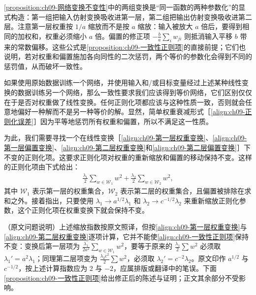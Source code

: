 \documentclass[../../main.tex]{subfiles}
\begin{document}
\begin{remark}\cref{proposition:ch09-网络变换不变性}中的两组变换是“同一函数的两种参数化”的显式构造：第一组把输入仿射变换吸收进第一层，第二组把输出仿射变换吸收进第二层。注意第一层权重按 $1/a$ 缩放而不是按 $a$ 缩放：输入被放大 $a$ 倍后，要得到相同的加权和，权重必须缩小 $a$ 倍。偏置的修正项 $-\frac{b}{a}\sum_{i}w_{ji}$ 则抵消输入平移 $b$ 带来的常数偏移。这些公式是\cref{proposition:ch09-一致性正则项}的直接前提；它们也说明，若对权重和偏置施加各向同性的二次惩罚，两个等价的参数化会得到不同的惩罚值，从而破坏一致性。
\end{remark}

如果使用原始数据训练一个网络，并使用输入和/或目标变量经过上述某种线性变换的数据训练另一个网络，那么一致性要求我们应该得到等价网络，它们区别仅仅在于是否对权重做了线性变换。任何正则化项都应该与这种性质一致，否则就会任意地偏好一种解而不是另一种等价的解。显然，简单权重衰减形式［\eqref{align:ch09-正则化误差}］因为平等地惩罚所有权重和偏置，所以不满足这一性质。

为此，我们需要寻找一个在线性变换［\eqref{align:ch09-第一层权重变换}、\eqref{align:ch09-第一层偏置变换}、\eqref{align:ch09-第二层权重变换}和\eqref{align:ch09-第二层偏置变换}］下不变的正则化项。这要求正则化项对权重的重新缩放和偏置的移动保持不变。这样的正则化项由下式给出：
\begin{align}
\frac{\lambda_{1}}{2}\sum_{w\in\mathcal{W}_{1}}w^{2}+\frac{\lambda_{2}}{2}\sum_{w\in\mathcal{W}_{2}}w^{2},
\label{align:ch09-一致性正则项}
\end{align}
其中 $\mathcal{W}_{1}$ 表示第一层的权重集合，$\mathcal{W}_{2}$ 表示第二层的权重集合，且偏置被排除在求和之外。接着指出，只要使用 $\lambda_{1}\to a^{1/2}\lambda_{1}$ 和 $\lambda_{2}\to c^{-1/2}\lambda_{2}$ 来重新缩放正则化参数，这个正则化项在权重变换下就会保持不变。

\begin{remark}（原文问题说明）上述缩放指数按原文照译，但按\eqref{align:ch09-第一层权重变换}与\eqref{align:ch09-第二层权重变换}逐项计算，它并不能使\eqref{align:ch09-一致性正则项}保持不变：变换后第一层项为 $\frac{\lambda_{1}}{2a^{2}}\sum_{w\in\mathcal{W}_{1}}w^{2}$，要等于原来的 $\frac{\lambda_{1}}{2}\sum w^{2}$ 必须取 $\lambda_{1}'=a^{2}\lambda_{1}$；同理第二层项变为 $\frac{\lambda_{2}c^{2}}{2}\sum w^{2}$，必须取 $\lambda_{2}'=c^{-2}\lambda_{2}$。原文印作 $a^{1/2}$ 与 $c^{-1/2}$，按上述计算指数应为 $2$ 与 $-2$，应属排版或翻译中的笔误。下面\cref{proposition:ch09-一致性正则项}给出修正后的陈述与证明；正文其余部分不受影响。
\end{remark}
\end{document}

